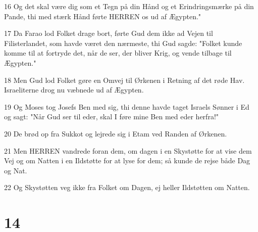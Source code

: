 \par 16 Og det skal være dig som et Tegn på din Hånd og et Erindringsmærke på din Pande, thi med stærk Hånd førte HERREN os ud af Ægypten."
\par 17 Da Farao lod Folket drage bort, førte Gud dem ikke ad Vejen til Filisterlandet, som havde været den nærmeste, thi Gud sagde: "Folket kunde komme til at fortryde det, når de ser, der bliver Krig, og vende tilbage til Ægypten."
\par 18 Men Gud lod Folket gøre en Omvej til Ørkenen i Retning af det røde Hav. Israeliterne drog nu væbnede ud af Ægypten.
\par 19 Og Moses tog Josefs Ben med sig, thi denne havde taget Israels Sønner i Ed og sagt: "Når Gud ser til eder, skal I føre mine Ben med eder herfra!"
\par 20 De brød op fra Sukkot og lejrede sig i Etam ved Randen af Ørkenen.
\par 21 Men HERREN vandrede foran dem, om dagen i en Skystøtte for at vise dem Vej og om Natten i en Ildstøtte for at lyse for dem; så kunde de rejse både Dag og Nat.
\par 22 Og Skystøtten veg ikke fra Folket om Dagen, ej heller Ildstøtten om Natten.

\chapter{14}

